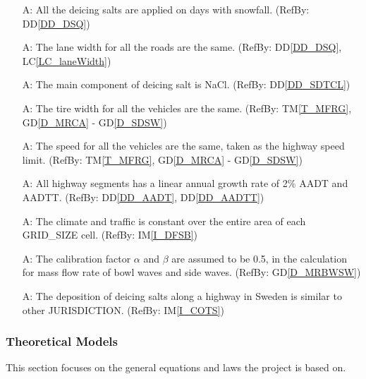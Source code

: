 \documentclass[12pt]{article}
\newcommand{\dref}[1]{GD\ref{#1}}
\newcommand{\ddref}[1]{DD\ref{#1}}
\newcommand{\tref}[1]{TM\ref{#1}}
\newcounter{assumpnum} %
\newcommand{\iref}[1]{IM\ref{#1}}
\newcommand{\lcref}[1]{LC\ref{#1}}
\begin{document}
\begin{itemize}

\item[A\refstepcounter{assumpnum}\theassumpnum \label{A_deicingSalts}:] All the deicing salts are applied on days with snowfall. (RefBy: \ddref{DD_DSQ})


\item[A\refstepcounter{assumpnum}\theassumpnum \label{A_laneWidth}:] The lane width for all the roads are the same. (RefBy: \ddref{DD_DSQ}, \lcref{LC_laneWidth})

\item[A\refstepcounter{assumpnum}\theassumpnum \label{A_NaCl}:] The main component of deicing salt is NaCl. (RefBy: \ddref{DD_SDTCL})

\item[A\refstepcounter{assumpnum}\theassumpnum \label{A_tireWidth}:] The tire width for all the vehicles are the same. (RefBy: \tref{T_MFRG},  \dref{D_MRCA} - \dref{D_SDSW})

\item[A\refstepcounter{assumpnum}\theassumpnum \label{A_Speed}:] The speed for all the vehicles are the same, taken as the highway speed limit. (RefBy: \tref{T_MFRG}, \dref{D_MRCA} - \dref{D_SDSW})

\item[A\refstepcounter{assumpnum}\theassumpnum \label{A_LinearGrowthTraffic}:]  All highway segments has a linear annual growth rate of 2\% AADT and AADTT. (RefBy: \ddref{DD_AADT}, \ddref{DD_AADTT})

\item[A\refstepcounter{assumpnum}\theassumpnum \label{A_Data}:] The climate and traffic is constant over the entire area of each GRID\_SIZE cell. (RefBy: \iref{I_DFSB})

\item[A\refstepcounter{assumpnum}\theassumpnum \label{A_Calibration}:] The calibration factor $\alpha$ and $\beta$ are assumed to be 0.5, in the calculation for mass flow rate of bowl waves and side waves. (RefBy: \dref{D_MRBWSW})

\item[A\refstepcounter{assumpnum}\theassumpnum \label{A_deicingSaltsDeposition}:] The deposition of deicing salts along a highway in Sweden is similar to other JURISDICTION. (RefBy: \iref{I_COTS})

\end{itemize}

\subsubsection{Theoretical Models}\label{sec_theoretical}
This section focuses on the general equations and laws the project is based on. 
\newline
\noindent
\end{document}
